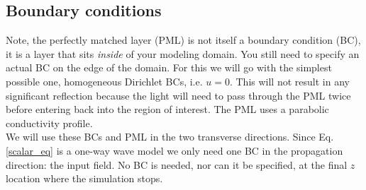 \documentclass[]{article}
\begin{document}
	\subsection{Boundary conditions}
	\label{BC_section}	
	Note, the perfectly matched layer (PML) is not itself a boundary condition (BC), it is a layer that sits \textit{inside} of your modeling domain. You still need to specify an actual BC on the edge of the domain. For this we will go with the simplest possible one, homogeneous Dirichlet BCs, i.e. $u=0$. This will not result in any significant reflection because the light will need to pass through the PML twice before entering back into the region of interest. The PML uses a parabolic conductivity profile.\\
	
	We will use these BCs and PML in the two transverse directions. Since Eq. \eqref{scalar_eq} is a one-way wave model we only need one BC in the propagation direction: the input field. No BC is needed, nor can it be specified, at the final $z$ location where the simulation stops.\\
	
\end{document}
